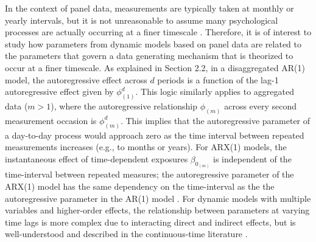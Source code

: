 \documentclass[man]{apa7} %
\begin{document}
In the context of panel data, measurements are typically taken at monthly or yearly intervals, but it is not unreasonable to assume many psychological processes are actually occurring at a finer timescale \parencite{dormann_optimal_2015, collins_effect_2002}. Therefore, it is of interest to study how parameters from dynamic models based on panel data are related to the parameters that govern a data generating mechanism that is theorized to occur at a finer timescale. As explained in Section 2.2, in a disaggregated AR(1) model, the autoregressive effect across $d$ periods is a function of the lag-1 autoregressive effect given by $\phi_{(1)}^{d}$. This logic similarly applies to aggregated data ($m > 1$), where the autoregressive relationship $\phi_{(m)}$ across every second measurement occasion is $\phi_{(m)}^{d}$. This implies that the autoregressive parameter of a day-to-day process would approach zero as the time interval between repeated measurements increases (e.g., to months or years). For ARX(1) models, the instantaneous effect of time-dependent exposures $\beta_{0_{(m)}}$ is independent of the time-interval between repeated measures; the autoregressive parameter of the ARX(1) model has the same dependency on the time-interval as the the autoregressive parameter in the AR(1) model \parencite{van_montfort_understanding_2018}. For dynamic models with multiple variables and higher-order effects, the relationship between parameters at varying time lags is more complex due to interacting direct and indirect effects, but is well-understood and described in the continuous-time literature \parencite[the interested reader is referred to][]{oud_sem_2018, van_montfort_continuous_2018}. 
\end{document}
